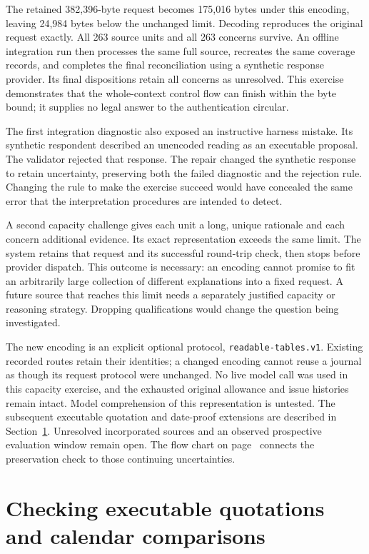 \documentclass[12pt,a4paper,oneside,openany]{book}
\begin{document}
The retained 382,396-byte request becomes 175,016 bytes under this encoding,
leaving 24,984 bytes below the unchanged limit. Decoding reproduces the original
request exactly. All 263 source units and all 263 concerns survive. An offline
integration run then processes the same full source, recreates the same coverage
records, and completes the final reconciliation using a synthetic response
provider. Its final dispositions retain all concerns as unresolved. This
exercise demonstrates that the whole-context control flow can finish within
the byte bound; it supplies no legal answer to the authentication circular.

The first integration diagnostic also exposed an instructive harness mistake.
Its synthetic respondent described an unencoded reading as an executable
proposal. The validator rejected that response. The repair changed the
synthetic response to retain uncertainty, preserving both the failed diagnostic
and the rejection rule. Changing the rule to make the exercise succeed would
have concealed the same error that the interpretation procedures are intended
to detect.

A second capacity challenge gives each unit a long, unique rationale and each
concern additional evidence. Its exact representation exceeds the same limit.
The system retains that request and its successful round-trip check, then stops
before provider dispatch. This outcome is necessary: an encoding cannot promise
to fit an arbitrarily large collection of different explanations into a fixed
request. A future source that reaches this limit needs a separately justified
capacity or reasoning strategy. Dropping qualifications would change the
question being investigated.

The new encoding is an explicit optional protocol,
\texttt{readable-tables.v1}. Existing recorded routes retain their identities;
a changed encoding cannot reuse a journal as though its request protocol were
unchanged. No live model call was used in this capacity exercise, and the
exhausted original allowance and issue histories remain intact. Model
comprehension of this representation is untested. The subsequent executable
quotation and date-proof extensions are described in
Section~\ref{sec:executable-dates}. Unresolved incorporated sources and an
observed prospective evaluation window remain open.
The flow chart on page~\pageref{map:lossless-context} connects the preservation
check to those continuing uncertainties.

\section{Checking executable quotations and calendar comparisons}
\label{sec:executable-dates}
\end{document}
